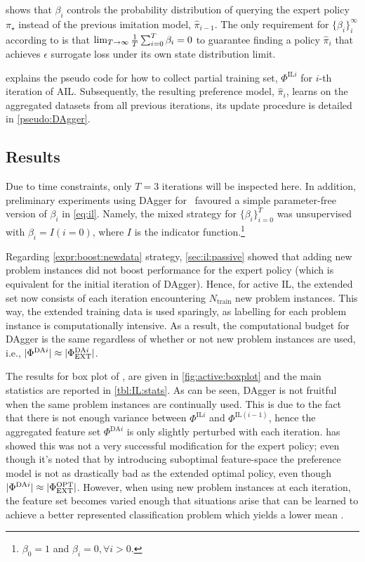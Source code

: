 \documentclass[twocolumn]{svjour3}
\begin{document}
 shows that $\beta_i$ controls the probability distribution of 
querying the expert policy $\pi_\star$ instead of the previous imitation model, 
$\hat{\pi}_{i-1}$. 
The only requirement for $\{\beta_i\}_i^\infty$ according to \cite{RossGB11} is 
that $\limit{\frac{1}{T}\sum_{i=0}^T\beta_i}{T\to\infty}{0}$ to guarantee 
finding a policy $\hat{\pi}_i$ that achieves $\epsilon$ surrogate loss under 
its own state distribution limit.

 explains the pseudo code for how to collect 
partial training set, $\Phi^{\text{IL}i}$ for $i$-th iteration of AIL.
Subsequently, the resulting preference model, $\hat{\pi}_i$, learns on the 
aggregated datasets from all previous iterations, its update procedure is 
detailed in \cref{pseudo:DAgger}.




\subsection{Results}\label{sec:ail:expr}
Due to time constraints, only $T=3$ iterations will be inspected here.
In addition, preliminary experiments using DAgger for \JSP\ favoured a 
simple parameter-free version of $\beta_i$ in \cref{eq:il}. 
Namely, the mixed strategy for $\{\beta_i\}_{i=0}^T$ was unsupervised 
with $\beta_i=I(i=0)$, where $I$ is the indicator 
function.\footnote{$\beta_0=1$ and $\beta_i=0,\forall i>0$.}

Regarding \ref{expr:boost:newdata} strategy, \cref{sec:il:passive} showed that 
adding new problem instances did not boost performance for the expert policy 
(which is equivalent for the initial iteration of DAgger). 
Hence, for active IL, the extended set now consists of each iteration 
encountering $N_{\text{train}}$ new problem instances.
This way, the extended training data is used sparingly, as labelling for each 
problem instance is computationally intensive. As a result, the computational 
budget for DAgger is the same regardless of whether or not new problem 
instances are used, i.e., 
$\abs{\Phi^{\text{DA}i}}\approx\abs{\Phi^{\text{DA}i}_{\text{EXT}}}$.

The results for  box plot of \namerho, are given in 
\cref{fig:active:boxplot} and the main statistics are reported in 
\cref{tbl:IL:stats}. As can be seen, DAgger is not fruitful when the same 
problem instances are continually used. This is due to the fact that there is 
not enough variance between $\Phi^{\text{IL}i}$ and $\Phi^{\text{IL}(i-1)}$, 
hence the aggregated feature set $\Phi^{\text{DA}i}$ is only slightly perturbed 
with each iteration.  has showed this was not a 
very successful modification for the expert policy; even though it's noted that 
by introducing suboptimal feature-space the preference model is not as 
drastically bad as the extended optimal policy, even though 
$\abs{\Phi^{\text{DA}i}}\approx\abs{\Phi^{\text{OPT}}_{\text{EXT}}}$.
However, when using new problem instances at each iteration, the feature set 
becomes varied enough that situations arise that can be learned to achieve a 
better represented classification problem which yields a lower mean \namerho.
\end{document}
